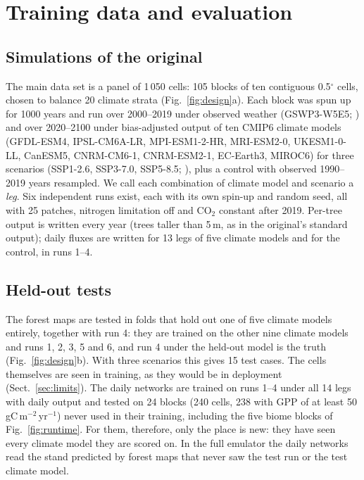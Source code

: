 \documentclass[11pt,a4paper]{article}
\begin{document}
\section{Training data and evaluation}\label{sec:eval}

\subsection{Simulations of the original}

The main data set is a panel of 1\,050 cells: 105 blocks of ten contiguous 0.5$^\circ$ cells, chosen to balance 20
climate strata (Fig.~\ref{fig:design}a). Each block was spun up for 1000 years and run over 2000--2019 under observed
weather (GSWP3-W5E5; \citealt{Lange2021W5E5}) and over 2020--2100 under bias-adjusted output \citep{Lange2019} of ten
CMIP6 climate models (GFDL-ESM4, IPSL-CM6A-LR, MPI-ESM1-2-HR, MRI-ESM2-0, UKESM1-0-LL, CanESM5, CNRM-CM6-1,
CNRM-ESM2-1, EC-Earth3, MIROC6) for three scenarios (SSP1-2.6, SSP3-7.0, SSP5-8.5; \citealt{ONeill2016}), plus a
control with observed 1990--2019 years resampled. We call each combination of climate model and scenario a \emph{leg}.
Six independent runs exist, each with its own spin-up and random seed, all with 25 patches, nitrogen limitation off and
CO$_2$ constant after 2019. Per-tree output is written every year (trees taller than 5\,m, as in the original's
standard output); daily fluxes are written for 13 legs of five climate models and for the control, in runs 1--4.

\subsection{Held-out tests}

The forest maps are tested in folds that hold out one of five climate models entirely, together with run 4: they are
trained on the other nine climate models and runs 1, 2, 3, 5 and 6, and run 4 under the held-out model is the truth
(Fig.~\ref{fig:design}b). With three scenarios this gives 15 test cases. The cells themselves are seen in training, as
they would be in deployment (Sect.~\ref{sec:limits}). The daily networks are trained on runs 1--4 under all 14 legs
with daily output and tested on 24 blocks (240 cells, 238 with GPP of at least 50\,gC\,m$^{-2}$\,yr$^{-1}$) never used
in their training, including the five biome blocks of Fig.~\ref{fig:runtime}. For them, therefore, only the place is
new: they have seen every climate model they are scored on. In the full emulator the daily networks read the stand
predicted by forest maps that never saw the test run or the test climate model.
\end{document}
